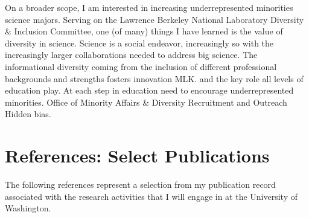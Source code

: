 \documentclass{article}
\begin{document}
On a broader scope, I am interested in increasing underrepresented minorities science majors.
Serving on the Lawrence Berkeley National Laboratory Diversity \& Inclusion Committee, one (of many) things I have
learned is the value of diversity in science.  Science is a social endeavor, increasingly so with
the increasingly larger collaborations needed to address big science.  The informational diversity
coming  from the inclusion of different professional backgrounds and strengths fosters innovation
MLK.
 and the key role all levels of education play.  At each step
in education need to encourage underrepresented minorities.
Office of Minority Affairs \& Diversity Recruitment and Outreach
Hidden bias.



\section{References: Select Publications}
The following references represent a selection from my publication record associated with the research
activities that I will engage in at the University of Washington.



\end{document}
